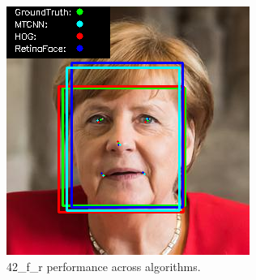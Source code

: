 \documentclass{l4proj}
\begin{document}
\begin{appendices}
\begin{figure}[h!]
  \centering
  \begin{minipage}{0.49\textwidth}
    \centering
     \includegraphics[width=\textwidth]{images/appendix/42.png}
    \caption{42\_f\_r performance across algorithms.}
    \label{whoopi_result}
  \end{minipage}
    \hfill
    \begin{minipage}{0.49\textwidth}
    \centering

\end{minipage}
\end{figure}
\end{appendices}
\end{document}
